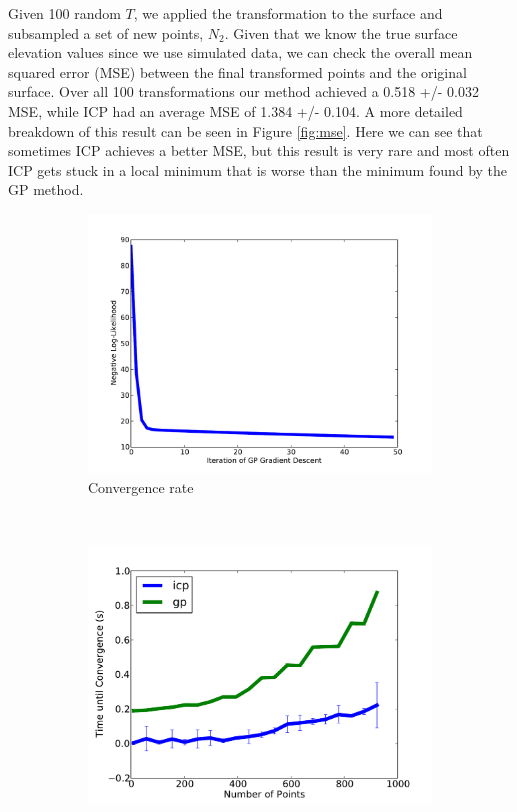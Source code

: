 \documentclass{article} %
\begin{document}
Given 100 random $T$, we applied the transformation to the surface and subsampled a set of new points, $N_2$. Given that we know the true surface elevation values since we use simulated data, we can check the overall mean squared error (MSE) between the final transformed points and the original surface. Over all 100 transformations our method achieved a 0.518 +/- 0.032 MSE, while ICP had an average MSE of 1.384 +/- 0.104. A more detailed breakdown of this result can be seen in Figure \ref{fig:mse}. Here we can see that sometimes ICP achieves a better MSE, but this result is very rare and most often ICP gets stuck in a local minimum that is worse than the minimum found by the GP method.


\begin{figure}
        \centering
        \begin{subfigure}[b]{0.5\textwidth}
                \centering
                \includegraphics[width=\textwidth]{LL.pdf}
                \caption{Convergence rate }
                \label{fig:convergence}
        \end{subfigure}%
        ~ %
        \begin{subfigure}[b]{0.5\textwidth}
                \centering
                \includegraphics[width=\textwidth]{scaling3.pdf}

\end{subfigure}
\end{figure}
\end{document}
